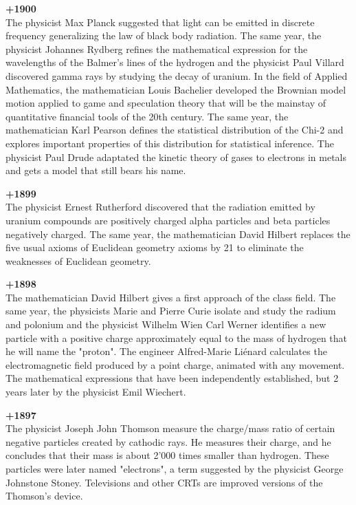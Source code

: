 \textbf{+1900}\\
The physicist Max Planck suggested that light can be emitted in discrete frequency generalizing the law of black body radiation. The same year, the physicist Johannes Rydberg refines the mathematical expression for the wavelengths of the Balmer's lines of the hydrogen and the physicist Paul Villard discovered gamma rays by studying the decay of uranium. In the field of Applied Mathematics, the mathematician Louis Bachelier developed the Brownian model motion applied to game and speculation theory that will be the mainstay of quantitative financial tools of the 20th century. The same year, the mathematician Karl Pearson defines the statistical distribution of the Chi-2 and explores important properties of this distribution for statistical inference. The physicist Paul Drude adaptated the kinetic theory of gases to electrons in metals and gets a model that still bears his name.

\textbf{+1899}\\
The physicist Ernest Rutherford discovered that the radiation emitted by uranium compounds are positively charged alpha particles and beta particles negatively charged. The same year, the mathematician David Hilbert replaces the five usual axioms of Euclidean geometry axioms by 21 to eliminate the weaknesses of Euclidean geometry. 

\textbf{+1898}\\
The mathematician David Hilbert gives a first approach of the class field. The same year, the physicists Marie and Pierre Curie isolate and study the radium and polonium and the physicist Wilhelm Wien Carl Werner identifies a new particle with a positive charge approximately equal to the mass of hydrogen that he will name the "proton". The engineer Alfred-Marie Liénard calculates the electromagnetic field produced by a point charge, animated with any movement. The mathematical expressions that have been independently established, but 2 years later by the physicist Emil Wiechert.

\textbf{+1897}\\
The physicist Joseph John Thomson measure the charge/mass ratio of certain negative particles created by cathodic rays. He measures their charge, and he concludes that their mass is about 2'000 times smaller than hydrogen. These particles were later named "electrons", a term suggested by the physicist George Johnstone Stoney. Televisions and other CRTs are improved versions of the Thomson's device.

